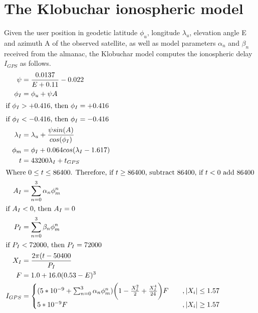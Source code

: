 \section{The Klobuchar ionospheric model}
\label{app:klobuchar}
Given the user position in geodetic latitude $\phi_u$, longitude $\lambda_u$, elevation angle E and azimuth A of the observed satellite, as well as model parameters $\alpha_n$ and $\beta_n$ received from the almanac, the Klobuchar model computes the ionospheric delay $I_{GPS}$ as follows.
\begin{subequations}
\begin{align}
	\psi &= \frac{0.0137}{E + 0.11} - 0.022\\
    \phi_I &= \phi_u + \psi A\\
    \intertext{if $\phi_I > +0.416$, then $\phi_I = +0.416$}
    \intertext{if $\phi_I < -0.416$, then $\phi_I = -0.416$}
    \lambda_I &= \lambda_u + \frac{\psi sin(A)}{cos(\phi_I)}\\
    \phi_m &= \phi_I + 0.064 cos(\lambda_I - 1.617)\\
    t &= 43200\lambda_I + t_{GPS}\\
    \intertext{Where $0 \leq t \leq 86400$. Therefore, if $t \geq 86400$, subtract 86400, if $t < 0$ add 86400}
    A_I &= \sum_{n=0}^{3}\alpha_n\phi_m^n\\
    \intertext{if $A_I < 0$, then $A_I = 0$}
    P_I &= \sum_{n=0}^{3}\beta_n\phi_m^n\\
    \intertext{if $P_I < 72000$, then $P_I = 72000$}
    X_I &= \frac{2\pi(t-50400}{P_I}\\
    F &= 1.0 + 16.0(0.53-E)^3\\
    I_{GPS} &= 
     \begin{cases}
     	(5*10^{-9} + \sum_{n=0}^{3}\alpha_n\phi_m^n)\bigg(1-\frac{X_I^2}{2} + \frac{X_I^4}{24}\bigg)F&\quad, |X_i| \leq 1.57\\
        5*10^{-9}F&\quad, |X_i| \geq 1.57
     \end{cases}
\end{align}



\end{subequations}
